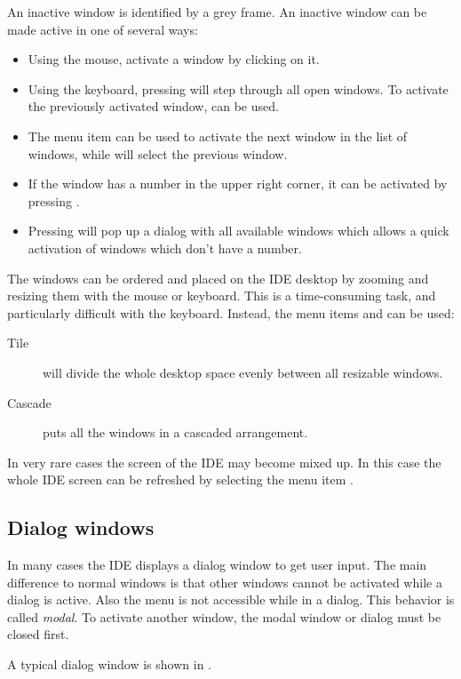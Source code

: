 An inactive window is identified by a grey frame. An inactive window can
be made active in one of several ways:
\begin{itemize}
\item Using the mouse, activate a window by clicking on it.
\item Using the keyboard, pressing  will step through all open
windows. To activate the previously activated window,  can
be used.
\item The menu item  can be used to activate the next
window in the list of windows, while  will select
the previous window.
\item If the window has a number in the upper right corner, it can be
activated by pressing .
\item Pressing  will pop up a dialog with all
available windows which allows a quick activation of windows which
don't have a number.
\end{itemize}

The windows can be ordered and placed on the IDE desktop by zooming and
resizing them with the mouse or keyboard. This is a time-consuming task,
and particularly difficult with the keyboard. Instead, the menu items
 and  can be used:
\begin{description}
\item[Tile] will divide the whole desktop space evenly between all resizable
windows.
\item[Cascade] puts all the windows in a cascaded arrangement.
\end{description}

In very rare cases the screen of the IDE may become mixed up. In this
case the whole IDE screen can be refreshed by selecting the menu item
.
%
%
\subsection{Dialog windows}
\label{se:dialogwindow}
In many cases the IDE displays a dialog window to get user input.
The main difference to normal windows is that other windows cannot be
activated while a dialog is active. Also the menu is not accessible while in
a dialog. This behavior is called \emph{modal}. To activate another window,
the modal window or dialog must be closed first.

A typical dialog window is shown in .

